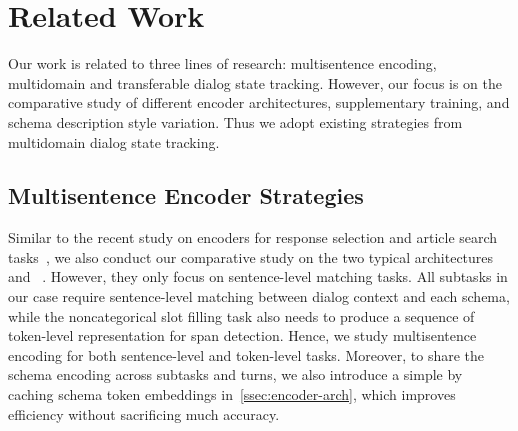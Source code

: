 \section{Related Work}
\label{sec:sgd:related-work}
Our work is related to three lines of research: multisentence
encoding, multidomain and transferable dialog state
tracking. However, our focus is on the comparative study of different
encoder architectures, supplementary training, and schema
description style variation. Thus we adopt existing strategies from
multidomain dialog state tracking.

\subsection{Multisentence Encoder Strategies}
\label{ssec:sgd:multi-encoder}
Similar to the recent study on encoders for response selection and
article search tasks~\citet{humeau2019poly}, we also conduct our
comparative study on the two typical architectures
\CE~\cite{bordes2014open, lowe2015ubuntu} and
\DE~\cite{wu2017sequential,yang2018response}. However, they only focus
on sentence-level matching tasks. All subtasks in our case require
sentence-level matching between dialog context and each schema, while
the noncategorical slot filling task also needs to produce a sequence
of token-level representation for span detection. Hence, we study
multisentence encoding for both sentence-level and token-level
tasks. Moreover, to share the schema encoding across subtasks and
turns, we also introduce a simple \FE by caching schema token
embeddings in~\autoref{ssec:encoder-arch}, which improves efficiency
without sacrificing much accuracy.

